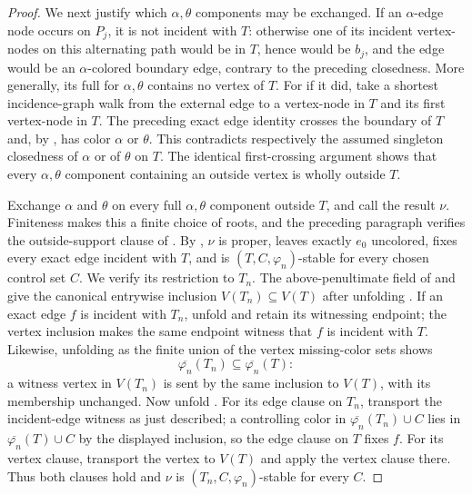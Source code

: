 \begin{proof}
We next justify which $\alpha,\theta$ components may be exchanged.  If an
$\alpha$-edge node occurs on $P_j$, it is not incident with $T$: otherwise
one of its incident vertex-nodes on this alternating path would be in
$T$, hence would be $b_j$, and the edge would be an $\alpha$-colored
boundary edge, contrary to the preceding closedness.  More generally,
its full  for $\alpha,\theta$ contains no
vertex of $T$.  For if it did, take a shortest incidence-graph walk from
the external edge to a vertex-node in $T$ and its first vertex-node in
$T$.  The preceding exact edge identity crosses the boundary of $T$ and,
by , has color $\alpha$ or $\theta$.
This contradicts respectively the assumed singleton closedness of
$\alpha$ or of $\theta$ on $T$.  The identical first-crossing argument
shows that every $\alpha,\theta$ component containing an outside vertex
is wholly outside $T$.

Exchange $\alpha$ and $\theta$ on every full $\alpha,\theta$ component
outside $T$, and call the result $\nu$.  Finiteness makes this a finite
choice of roots, and the preceding paragraph verifies the outside-support
clause of .  By
, $\nu$ is proper, leaves exactly
$e_0$ uncolored, fixes every exact edge incident with $T$, and is
$(T,C,\varphi_n)$-stable for every chosen control set $C$.  We verify its
restriction to $T_n$.  The above-penultimate field of
 and
 give the canonical entrywise
inclusion $V(T_n)\subseteq V(T)$ after unfolding
.  If an exact edge $f$ is incident with
$T_n$, unfold  and retain its witnessing
endpoint; the vertex inclusion makes the same endpoint witness that $f$
is incident with $T$.  Likewise, unfolding 
as the finite union of the vertex missing-color sets shows
\[
 \overline{\varphi_n}(T_n)\subseteq
 \overline{\varphi_n}(T):
\]
a witness vertex in $V(T_n)$ is sent by the same inclusion to $V(T)$,
with its  membership unchanged.  Now unfold
.  For its edge clause on $T_n$, transport the
incident-edge witness as just described; a controlling color in
$\overline{\varphi_n}(T_n)\cup C$ lies in
$\overline{\varphi_n}(T)\cup C$ by the displayed inclusion, so the edge
clause on $T$ fixes $f$.  For its vertex clause, transport the vertex to
$V(T)$ and apply the vertex clause there.  Thus both clauses hold and
$\nu$ is $(T_n,C,\varphi_n)$-stable for every $C$.


\end{proof}
